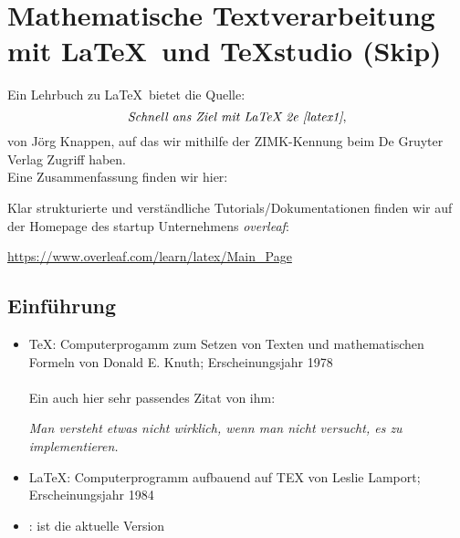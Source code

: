 \section{Mathematische Textverarbeitung mit \LaTeX~und TeXstudio (Skip)}
Ein Lehrbuch zu \LaTeX~bietet die Quelle:
$$\textit{Schnell ans Ziel mit LaTeX 2e \cite{latex1}},$$
von Jörg Knappen, auf das wir mithilfe der ZIMK-Kennung beim De Gruyter Verlag Zugriff haben.\\
Eine Zusammenfassung finden wir hier:
\begin{center}
\end{center}
Klar strukturierte und verständliche Tutorials/Dokumentationen finden wir auf der Homepage des startup Unternehmens \textit{overleaf}:
\begin{center}
	\url{https://www.overleaf.com/learn/latex/Main_Page}
\end{center}


\subsection{Einführung}
\begin{itemize}
	\item \TeX: Computerprogamm zum Setzen von Texten und mathematischen Formeln von Donald E. Knuth; Erscheinungsjahr 1978\\~\\
	Ein auch hier sehr passendes Zitat von ihm:
	\begin{center}
	\textit{	Man versteht etwas nicht wirklich, wenn man nicht versucht, es zu implementieren.}
	\end{center}

\item \LaTeX: Computerprogramm aufbauend auf TEX von Leslie Lamport; Erscheinungsjahr 1984
\item \LaTeXe: ist die aktuelle Version
\end{itemize}

